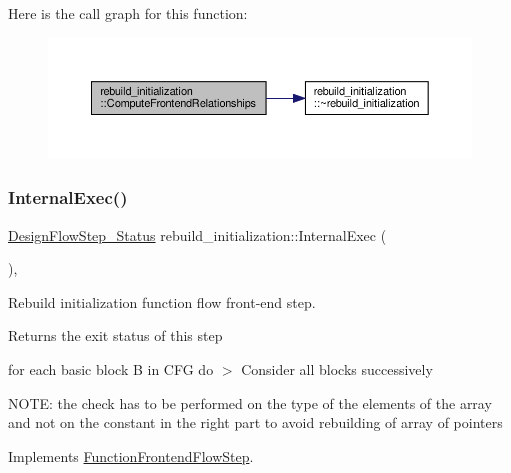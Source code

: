Here is the call graph for this function\+:
\nopagebreak
\begin{figure}[H]
\begin{center}
\leavevmode
\includegraphics[width=350pt]{de/d85/classrebuild__initialization_a829e690735887f26f8fb2067fe1abf1f_cgraph}
\end{center}
\end{figure}
\mbox{\label{classrebuild__initialization_ac95e61c5c62f6c0a5b4ce1557b32ae4f}} 
\subsubsection{\texorpdfstring{Internal\+Exec()}{InternalExec()}}
{\footnotesize\ttfamily \hyperlink{design__flow__step_8hpp_afb1f0d73069c26076b8d31dbc8ebecdf}{Design\+Flow\+Step\+\_\+\+Status} rebuild\+\_\+initialization\+::\+Internal\+Exec (\begin{DoxyParamCaption}{ }\end{DoxyParamCaption})\hspace{0.3cm}{\ttfamily [override]}, {\ttfamily [virtual]}}



Rebuild initialization function flow front-\/end step. 

\begin{DoxyReturn}{Returns}
the exit status of this step 
\end{DoxyReturn}
for each basic block B in C\+FG do $>$ Consider all blocks successively

N\+O\+TE\+: the check has to be performed on the type of the elements of the array and not on the constant in the right part to avoid rebuilding of array of pointers 

Implements \hyperlink{classFunctionFrontendFlowStep_a00612f7fb9eabbbc8ee7e39d34e5ac68}{Function\+Frontend\+Flow\+Step}.



